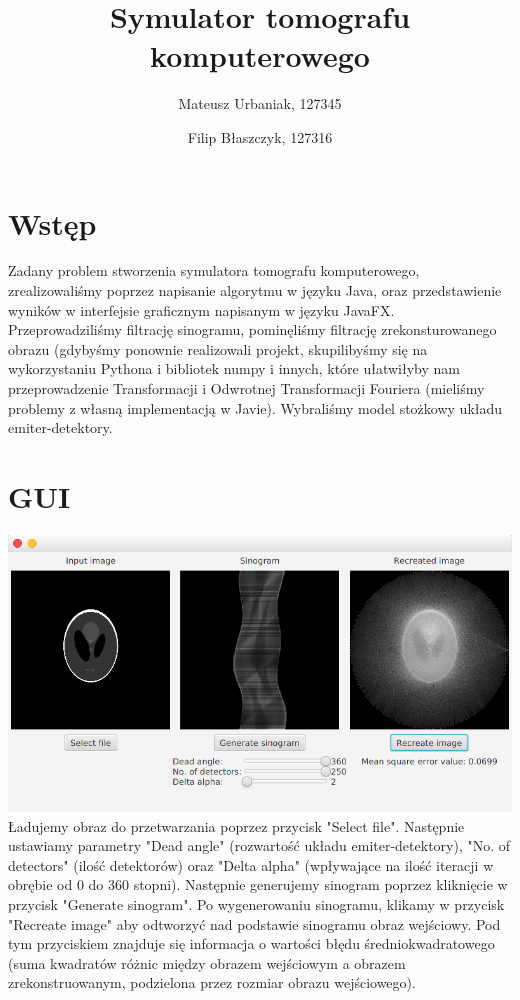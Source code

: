 \documentclass[a4paper,11pt]{article}
\title {Symulator tomografu komputerowego}
\author{Mateusz Urbaniak, 127345 \and Filip Błaszczyk, 127316}
\begin{document}
\maketitle

\section{Wstęp}
Zadany problem stworzenia symulatora tomografu komputerowego, zrealizowaliśmy poprzez napisanie algorytmu w języku Java, oraz przedstawienie wyników w interfejsie graficznym napisanym w języku JavaFX. Przeprowadziliśmy filtrację sinogramu, pominęliśmy filtrację zrekonsturowanego obrazu (gdybyśmy ponownie realizowali projekt, skupilibyśmy się na wykorzystaniu Pythona i bibliotek numpy i innych, które ułatwiłyby nam przeprowadzenie Transformacji i Odwrotnej Transformacji Fouriera (mieliśmy problemy z własną implementacją w Javie). Wybraliśmy model stożkowy układu emiter-detektory.

\section{GUI}
\includegraphics[width=\textwidth]{GUI}
Ładujemy obraz do przetwarzania poprzez przycisk "Select file".
Następnie ustawiamy parametry "Dead angle" (rozwartość układu emiter-detektory), "No. of detectors" (ilość detektorów) oraz "Delta alpha" (wpływające na ilość iteracji w obrębie od 0 do 360 stopni). Następnie generujemy sinogram poprzez kliknięcie w przycisk "Generate sinogram". Po wygenerowaniu sinogramu, klikamy w przycisk "Recreate image" aby odtworzyć nad podstawie sinogramu obraz wejściowy. Pod tym przyciskiem znajduje się informacja o wartości błędu średniokwadratowego (suma kwadratów różnic między obrazem wejściowym a obrazem zrekonstruowanym, podzielona przez rozmiar obrazu wejściowego).
\end{document}
